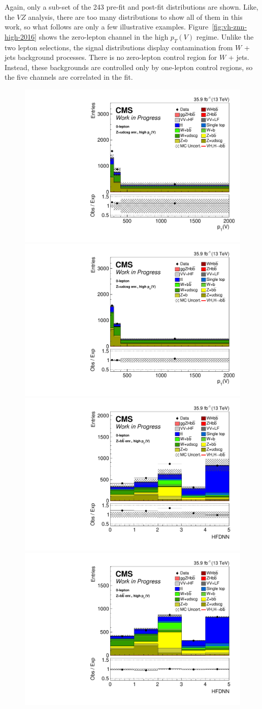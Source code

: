 Again, only a sub-set of the 243 pre-fit and post-fit distributions are shown.
Like, the $V\!Z$ analysis, there are too many distributions to show all of them in this work,
so what follows are only a few illustrative examples.
Figure~\ref{fig:vh-znn-high-2016} shows the zero-lepton channel in the high $p_T(V)$ regime.
Unlike the two lepton selections,
the signal distributions display contamination from $W$ + jets background processes.
There is no zero-lepton control region for $W$ + jets.
Instead, these backgrounds are controlled only by one-lepton control regions,
so the five channels are correlated in the fit.
%
\begin{figure}
  \centering
  \includegraphics[width=0.35\linewidth]{figures/210322_STXSfine_400split_unblinded_Xbb_025349b6_postfitplots/plot_shapes_vhbb_Znn_14_13TeV2016_prefit.pdf}
  \includegraphics[width=0.35\linewidth]{figures/210322_STXSfine_400split_unblinded_Xbb_025349b6_postfitplots/plot_shapes_vhbb_Znn_14_13TeV2016_postfit.pdf} \\
  \includegraphics[width=0.35\linewidth]{figures/210322_STXSfine_400split_unblinded_Xbb_025349b6_postfitplots/plot_shapes_vhbb_Znn_15_13TeV2016_prefit.pdf}
  \includegraphics[width=0.35\linewidth]{figures/210322_STXSfine_400split_unblinded_Xbb_025349b6_postfitplots/plot_shapes_vhbb_Znn_15_13TeV2016_postfit.pdf} \\

\end{figure}
